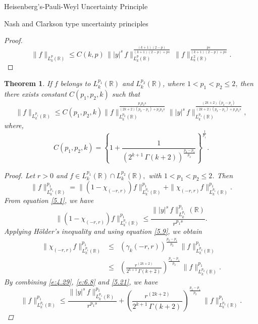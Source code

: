 \documentclass[12pt,a4paper,reqno]{amsproc}
\newtheorem{theorem}{Theorem}[section]
\theoremstyle{definition}
\theoremstyle{remark}
\numberwithin{equation}{section}
\begin{document}
\begin{subsection}{Heisenberg's-Pauli-Weyl Uncertainty Principle}
\begin{subsection}{Nash and Clarkson type uncertainty principles}
\begin{proof}
\begin{equation*}
 \|f\|_{L_k^p(\mathbb{R})}    \le C(k,p)\, \||y|^s\, f\|^{\frac{(k+1)(2-p)}{(k+1)(2-p)+ps}}_{L_k^p(\mathbb{R})}\, \|f\|^{\frac{ps}{(k+1)(2-p)+ps}}_{L_k^2(\mathbb{R})} .   
\end{equation*}
\end{proof}
\begin{theorem}\label{t:4.9}
If $f$ belongs to $ L_k^{p_1}(\mathbb{R})$ and $ L_k^{p_2}(\mathbb{R}) $, where $1<p_1<p_2\le 2$,  then there exists constant $C(p_1,p_2,k)$ such that 
\begin{equation*}
    \|f\|_{L_k^{p_1}(\mathbb{R})} \le C(p_1,p_2,k) \|f\|_{L_k^{p_2}(\mathbb{R})}^{\frac{p_1p_2s}{(2k+2)(p_2-p_1)+p_1p_2s}}\||y|^s\,f\|^{\frac{(2k+2)\,(p_2-p_1)}{(2k+2)(p_2-p_1)+p_1p_2s}}_{L_k^{p_1}(\mathbb{R})},
\end{equation*}
where,
\begin{equation*}
  C(p_1,p_2,k) = \left\{ 1+\frac{1}{(2^{k+1}\,\Gamma(k+2))^{\frac{p_2-p_1}{p_2}}}\right\}^{\frac{1}{p_1}}.  
\end{equation*}
\begin{proof}
Let $r>0$ and $f\in L_k^{p_1}(\mathbb{R})\cap L_k^{p_2}(\mathbb{R}),$ with $ 1<p_1<p_2\le 2$. Then
\begin{equation}\label{e:4.29}
 \|f\|^{p_1}_{L_k^{p_1}(\mathbb{R})}=\|\left(1-\chi_{(-r,r)}\right) f\|^{p_1}_{L_k^{p_1}(\mathbb{R})}+  \|\chi_{(-r,r)}f\|^{p_1}_{L_k^{p_1}(\mathbb{R})}. 
\end{equation}
From  equation \eqref{5.1}, we have
\begin{equation} \label{e:6.8}
\|\left(1-\chi_{(-r,r)}\right) f\|^{p_1}_{L_k^{p_1}(\mathbb{R})}\le \frac{\||y|^s\,f\|^{p_1}_{L_k^{p_1}}(\mathbb{R})}{r^{p_1s}} .  
\end{equation}
Applying H{\"o}lder's inequality and using equation \eqref{5.9},  we obtain 
\begin{eqnarray} \label{5.21}
\nonumber \|\chi_{(-r,r)}f\|^{p_1}_{L_k^{p_1}(\mathbb{R})}&\le& \left(\gamma_k(-r,r)\right)^{\frac{p_2-p_1}{p_2}}\, \|f\|^{p_1}_{L_k^{p_2}(\mathbb{R})} \\
 &\le& \left(\frac{r^{(2k+2)}}{2^{k+1}\,\Gamma(k+2)\, }\right)^{\frac{p_2-p_1}{p_2}}\, \|f\|^{p_1}_{L_k^{p_2}(\mathbb{R})}.
\end{eqnarray}
By combining  \eqref{e:4.29}, \eqref{e:6.8} and \eqref{5.21}, we have
\begin{equation*}
    \|f\|^{p_1}_{L_k^{p_1}(\mathbb{R})} \le \frac{\||y|^s\,f\|^{p_1}_{L_k^{p_1}(\mathbb{R})}}{r^{p_1s}} +\left(\frac{r^{(2k+2)}}{2^{k+1}\,\Gamma(k+2)\, }\right)^{\frac{p_2-p_1}{p_2}}\, \|f\|^{p_1}_{L_k^{p_2}(\mathbb{R})}.

\end{equation*}
\end{proof}
\end{theorem}
\end{subsection}
\end{subsection}
\end{document}
